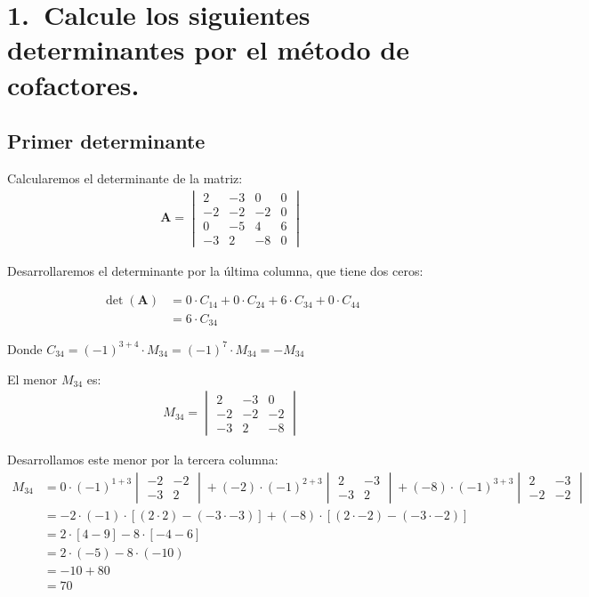 \documentclass{report} %
\begin{document}

\section*{1.\ Calcule los siguientes determinantes por el método de cofactores.}

\subsection*{Primer determinante}
Calcularemos el determinante de la matriz:
\begin{align*}
\mathbf{A} = \begin{vmatrix}
2 & -3 & 0 & 0 \\
-2 & -2 & -2 & 0 \\
0 & -5 & 4 & 6 \\
-3 & 2 & -8 & 0
\end{vmatrix}
\end{align*}

Desarrollaremos el determinante por la última columna, que tiene dos ceros:

\begin{align*}
\det(\mathbf{A}) &= 0 \cdot C_{14} + 0 \cdot C_{24} + 6 \cdot C_{34} + 0 \cdot C_{44}\\
&= 6 \cdot C_{34}
\end{align*}

Donde $C_{34} = (-1)^{3+4} \cdot M_{34} = (-1)^7 \cdot M_{34} = -M_{34}$

El menor $M_{34}$ es:
\begin{align*}
M_{34} = \begin{vmatrix}
2 & -3 & 0 \\
-2 & -2 & -2 \\
-3 & 2 & -8
\end{vmatrix}
\end{align*}

Desarrollamos este menor por la tercera columna:
\begin{align*}
M_{34} &= 0 \cdot (-1)^{1+3} \begin{vmatrix}
-2 & -2 \\
-3 & 2
\end{vmatrix} + (-2) \cdot (-1)^{2+3} \begin{vmatrix}
2 & -3 \\
-3 & 2
\end{vmatrix} + (-8) \cdot (-1)^{3+3} \begin{vmatrix}
2 & -3 \\
-2 & -2
\end{vmatrix} \\
&= -2 \cdot (-1) \cdot [(2 \cdot 2) - (-3 \cdot -3)] + (-8) \cdot [(2 \cdot -2) - (-3 \cdot -2)] \\
&= 2 \cdot [4 - 9] - 8 \cdot [-4 - 6] \\
&= 2 \cdot (-5) - 8 \cdot (-10) \\
&= -10 + 80 \\
&= 70
\end{align*}
\end{document}
